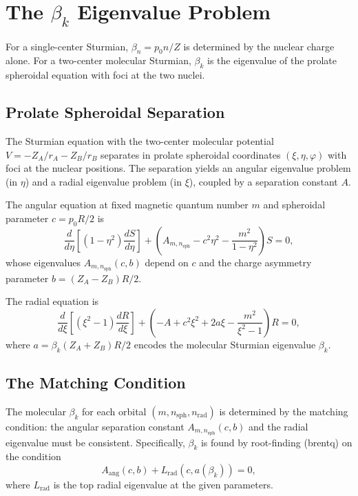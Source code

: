 \documentclass[aps,pra,twocolumn,superscriptaddress,longbibliography]{revtex4-2}
\begin{document}
\section{The $\beta_k$ Eigenvalue Problem}
\label{sec:beta}

For a single-center Sturmian, $\beta_n = p_0 n/Z$ is determined by
the nuclear charge alone.  For a two-center molecular Sturmian, $\beta_k$
is the eigenvalue of the prolate spheroidal equation with foci at the
two nuclei.

\subsection{Prolate Spheroidal Separation}

The Sturmian equation with the two-center molecular potential
$V = -Z_A/r_A - Z_B/r_B$ separates in prolate spheroidal coordinates
$(\xi, \eta, \varphi)$ with foci at the nuclear positions.  The
separation yields an angular eigenvalue problem (in $\eta$) and a
radial eigenvalue problem (in $\xi$), coupled by a separation constant
$A$.

The angular equation at fixed magnetic quantum number $m$ and spheroidal
parameter $c = p_0 R/2$ is
\begin{equation}
\frac{d}{d\eta}\!\left[(1-\eta^2)\frac{dS}{d\eta}\right]
+ \left(A_{m,n_{\text{sph}}} - c^2\eta^2
- \frac{m^2}{1-\eta^2}\right)S = 0,
\label{eq:angular_eq}
\end{equation}
whose eigenvalues $A_{m,n_{\text{sph}}}(c, b)$ depend on $c$ and the
charge asymmetry parameter $b = (Z_A - Z_B)R/2$.

The radial equation is
\begin{equation}
\frac{d}{d\xi}\!\left[(\xi^2-1)\frac{dR}{d\xi}\right]
+ \left(-A + c^2\xi^2 + 2a\xi
- \frac{m^2}{\xi^2-1}\right)R = 0,
\label{eq:radial_eq}
\end{equation}
where $a = \beta_k(Z_A + Z_B)R/2$ encodes the molecular Sturmian
eigenvalue $\beta_k$.

\subsection{The Matching Condition}

The molecular $\beta_k$ for each orbital $(m, n_{\text{sph}}, n_{\text{rad}})$
is determined by the matching condition: the angular separation constant
$A_{m,n_{\text{sph}}}(c, b)$ and the radial eigenvalue must be
consistent.  Specifically, $\beta_k$ is found by root-finding (brentq)
on the condition
\begin{equation}
A_{\text{ang}}(c, b) + L_{\text{rad}}(c, a(\beta_k)) = 0,
\label{eq:matching}
\end{equation}
where $L_{\text{rad}}$ is the top radial eigenvalue at the given parameters.
\end{document}
